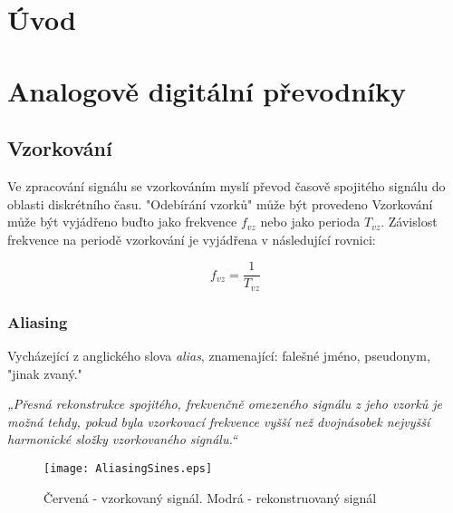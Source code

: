 \documentclass[oneside,12pt,a4paper]{template/SPSTemplate} %
\begin{document}
	\makebeginning

	\tableofcontents

	
	\chapter{Úvod}
	
	\chapter{Analogově digitální převodníky}
	\section{Vzorkování}
	Ve zpracování signálu se vzorkováním myslí převod časově spojitého signálu do oblasti diskrétního
	času. "Odebírání vzorků" může být provedeno Vzorkování může být vyjádřeno buďto jako frekvence $ f_{vz} $ nebo jako perioda $ T_{vz} $.
	Závislost frekvence na periodě vzorkování je vyjádřena v následující rovnici:
	
	\begin{equation}
	f_{vz} = \frac{1}{T_{vz}}
	\end{equation}

	
	\subsection{Aliasing}
	Vycházející z anglického slova \textit{alias}, znamenající: falešné jméno, pseudonym, "jinak zvaný." 
	

\textit{„Přesná rekonstrukce spojitého, frekvenčně omezeného signálu z jeho vzorků je možná tehdy, pokud byla vzorkovací frekvence vyšší než dvojnásobek nejvyšší harmonické složky vzorkovaného signálu.“}\cite{sampling_nyquist}
	
	\begin{figure}
		\centering
		\texttt{[image: AliasingSines.eps]}
		\caption{Červená - vzorkovaný signál. Modrá - rekonstruovaný signál}
		\label{img:aliasing}
	\end{figure}
	
	
	\appendix
	
	\printbibliography
	
	\listoffigures
	\listoftables
	
\end{document}
